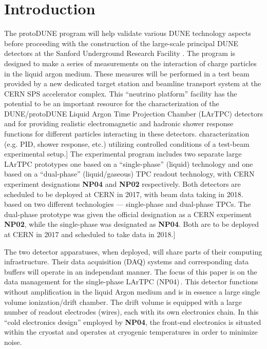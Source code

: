 \documentclass[a4paper]{jpconf}
\newcommand{\Omit}[1]{}
\newcommand{\pd}{protoDUNE\xspace}
\begin{document}
\section{Introduction}
The \pd program will help validate various DUNE technology aspects before proceeding with
the construction of the large-scale principal DUNE detectors at the Sanford Underground Research Facility \cite{cdrVol1, cdrVol4}.
The program is designed to make a series of measurements on the
interaction of charge particles in the liquid argon medium.  These
measures will be performed in a test beam provided by a new dedicated
target station and beamline transport system at the CERN SPS
accelerator complex.  This ``neutrino platform'' facility has the
potential to be an important resource for the characterization of the DUNE/protoDUNE
Liquid Argon Time Projection Chamber (LArTPC) detectors and for
providing realistic electromagnetic and hadronic shower response
functions for different particles interacting in these detectors. \Omit[  characterization (e.g. PID, shower response, etc.)
utilizing controlled conditions of a test-beam experimental setup.]
The experimental program includes two separate
large LArTPC prototypes one based on a ``single-phase'' (liquid) technology and
one based on a ``dual-phase'' (liquid/gaseous) TPC readout technology,
with CERN experiment designations \textbf{NP04} and \textbf{NP02}
respectively.  Both detectors are scheduled to be deployed at CERN in
2017, with beam data taking in 2018.
\Omit[based on two different technologies --- single-phase and dual-phase TPCs.
The dual-phase prototype was given the official designation as a CERN experiment \textbf{NP02},
while the single-phase was designated as \textbf{NP04}. Both are to be deployed at CERN in 2017
and scheduled to take data in 2018.]

The two detector apparatuses, when deployed, will share parts of their
computing infrastructure.  Their data acquisition (DAQ) systems and
corresponding data buffers will operate in an independant manner. 
The focus of this paper is on the data management for the
single-phase LArTPC (NP04)\,\cite{np04}. This detector  functions without amplification
in the liquid Argon medium and is in essence a large single volume
ionization/drift chamber.  The drift volume is equipped with
a large number of readout electrodes (wires), each with its own electronics chain.
In this ``cold electronics design'' employed by \textbf{NP04},  the front-end electronics is situated within the cryostat and operates at cryogenic
temperatures in order to minimize noise.
\end{document}
